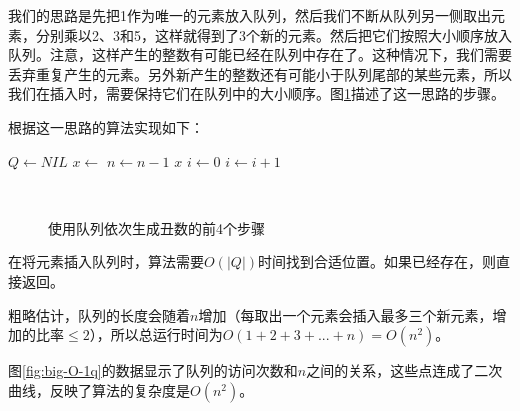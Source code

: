 \documentclass[UTF8]{article}
\begin{document}
我们的思路是先把1作为唯一的元素放入队列，然后我们不断从队列另一侧取出元素，分别乘以2、3和5，这样就得到了3个新的元素。然后把它们按照大小顺序放入队列。注意，这样产生的整数有可能已经在队列中存在了。这种情况下，我们需要丢弃重复产生的元素。另外新产生的整数还有可能小于队列尾部的某些元素，所以我们在插入时，需要保持它们在队列中的大小顺序。图\ref{fig:queues}描述了这一思路的步骤。

根据这一思路的算法实现如下：

\begin{algorithmic}[1]
  \State $Q \gets NIL$
  \State {}
    \State $x \gets$ 
    \State {}
    \State {}
    \State {}
    \State $n \gets n-1$
  \EndWhile
  \State \Return $x$
\EndFunction
\Statex
{}
  \State $i \gets 0$
    \State $i \gets i + 1$
  \EndWhile
    \State \Return
  \EndIf
  \State {}
\EndFunction
\end{algorithmic}

\begin{figure}[htbp]
  \renewcommand*\thesubfigure{\arabic{subfigure}}
  \centering
   \hspace{.1\textwidth}
   \\
   \hspace{.1\textwidth}
  \caption{使用队列依次生成丑数的前4个步骤} \label{fig:queues}
\end{figure}

在将元素插入队列时，算法需要$O(|Q|)$时间找到合适位置。如果已经存在，则直接返回。

粗略估计，队列的长度会随着$n$增加（每取出一个元素会插入最多三个新元素，增加的比率$\leq 2$），所以总运行时间为$O(1+2+3+...+n) = O(n^2)$。

图\ref{fig:big-O-1q}的数据显示了队列的访问次数和$n$之间的关系，这些点连成了二次曲线，反映了算法的复杂度是$O(n^2)$。
\end{document}
